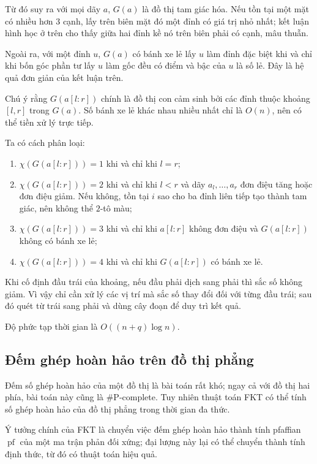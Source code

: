 \documentclass[11pt]{article}
\begin{document}
Từ đó suy ra với mọi dãy $a$, $G(a)$ là đồ thị tam giác hóa. Nếu tồn tại một
mặt có nhiều hơn $3$ cạnh, lấy trên biên mặt đó một đỉnh có giá trị nhỏ nhất;
kết luận hình học ở trên cho thấy giữa hai đỉnh kề nó trên biên phải có cạnh,
mâu thuẫn.

Ngoài ra, với một đỉnh $u$, $G(a)$ có bánh xe lẻ lấy $u$ làm đỉnh đặc biệt khi
và chỉ khi bốn góc phần tư lấy $u$ làm gốc đều có điểm và bậc của $u$ là số lẻ.
Đây là hệ quả đơn giản của kết luận trên.

Chú ý rằng $G(a[l:r])$ chính là đồ thị con cảm sinh bởi các đỉnh thuộc khoảng
$[l,r]$ trong $G(a)$. Số bánh xe lẻ khác nhau nhiều nhất chỉ là $O(n)$, nên có
thể tiền xử lý trực tiếp.

Ta có cách phân loại:
\begin{enumerate}
  \item $\chi(G(a[l:r]))=1$ khi và chỉ khi $l=r$;
  \item $\chi(G(a[l:r]))=2$ khi và chỉ khi $l<r$ và dãy $a_l,\ldots,a_r$ đơn
  điệu tăng hoặc đơn điệu giảm. Nếu không, tồn tại $i$ sao cho ba đỉnh liên
  tiếp tạo thành tam giác, nên không thể $2$-tô màu;
  \item $\chi(G(a[l:r]))=3$ khi và chỉ khi $a[l:r]$ không đơn điệu và
  $G(a[l:r])$ không có bánh xe lẻ;
  \item $\chi(G(a[l:r]))=4$ khi và chỉ khi $G(a[l:r])$ có bánh xe lẻ.
\end{enumerate}

Khi cố định đầu trái của khoảng, nếu đầu phải dịch sang phải thì sắc số không
giảm. Vì vậy chỉ cần xử lý các vị trí mà sắc số thay đổi đối với từng đầu trái;
sau đó quét từ trái sang phải và dùng cây đoạn để duy trì kết quả.

Độ phức tạp thời gian là $O((n+q)\log n)$.

\subsection{Đếm ghép hoàn hảo trên đồ thị phẳng}

Đếm số ghép hoàn hảo của một đồ thị là bài toán rất khó; ngay cả với đồ thị hai
phía, bài toán này cũng là \#P-complete. Tuy nhiên thuật toán FKT có thể tính
số ghép hoàn hảo của đồ thị phẳng trong thời gian đa thức.

Ý tưởng chính của FKT là chuyển việc đếm ghép hoàn hảo thành tính pfaffian
\(\operatorname{pf}\) của một ma trận phản đối xứng; đại lượng này lại có thể
chuyển thành tính định thức, từ đó có thuật toán hiệu quả.
\end{document}
